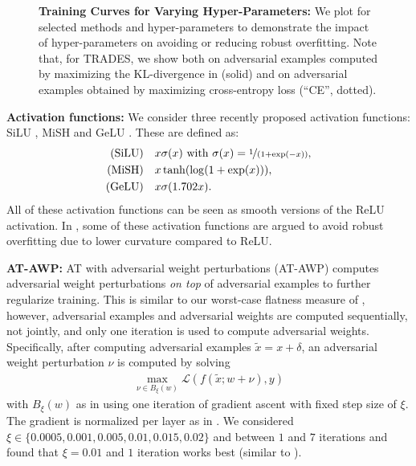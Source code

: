 \begin{figure}[t]
\begin{minipage}[t]{0.23\textwidth}
	\end{minipage}
	\caption{\textbf{Training Curves for Varying Hyper-Parameters:} We plot \RCE for selected methods and hyper-parameters to demonstrate the impact of hyper-parameters on avoiding or reducing robust overfitting. Note that, for TRADES, we show both \RCE on adversarial examples computed by maximizing the KL-divergence in  (solid) and on adversarial examples obtained by maximizing cross-entropy loss (``CE'', dotted).}
	\label{fig:supp-training-ablation}
\end{figure}

\textbf{Activation functions:}
%
We consider three recently proposed activation functions: SiLU \cite{ElfwingNN2018}, MiSH \cite{MisraBMVC2020} and GeLU \cite{HendrycksARXIV2016}. These are defined as:
\begin{align}
	(\text{SiLU})\quad &x \sigma(x)\text{ with } \sigma(x) = \nicefrac{1}{(1 + \exp(-x))},\\
	(\text{MiSH})\quad &x \tanh(\log(1 + \exp(x))),\\
	(\text{GeLU})\quad &x \sigma(1.702 x).
\end{align}
All of these activation functions can be seen as smooth versions of the ReLU activation.
In \cite{SinglaARXIV2021}, some of these activation functions are argued to avoid robust overfitting due to lower curvature compared to ReLU.

\textbf{AT-AWP:}
%
AT with adversarial weight perturbations (AT-AWP) \cite{WuNIPS2020} computes adversarial weight perturbations \emph{on top} of adversarial examples to further regularize training. This is similar to our worst-case flatness measure of \RCE, however, adversarial examples and adversarial weights are computed sequentially, not jointly, and only one iteration is used to compute adversarial weights. Specifically, after computing adversarial examples $\tilde{x} = x + \delta$,
an adversarial weight perturbation $\nu$ is computed by solving
\begin{align}
	\max_{\nu \in B_\xi(w)} \mathcal{L}(f(\tilde{x}; w + \nu), y)
\end{align}
with $B_\xi(w)$ as in  using one iteration of gradient ascent with fixed step size of $\xi$. The gradient is normalized per layer as in .
We considered $\xi \in \{0.0005, 0.001, 0.005, 0.01, 0.015, 0.02\}$ and between $1$ and $7$ iterations and found that $\xi = 0.01$ and $1$ iteration works best (similar to \cite{WuNIPS2020}).


